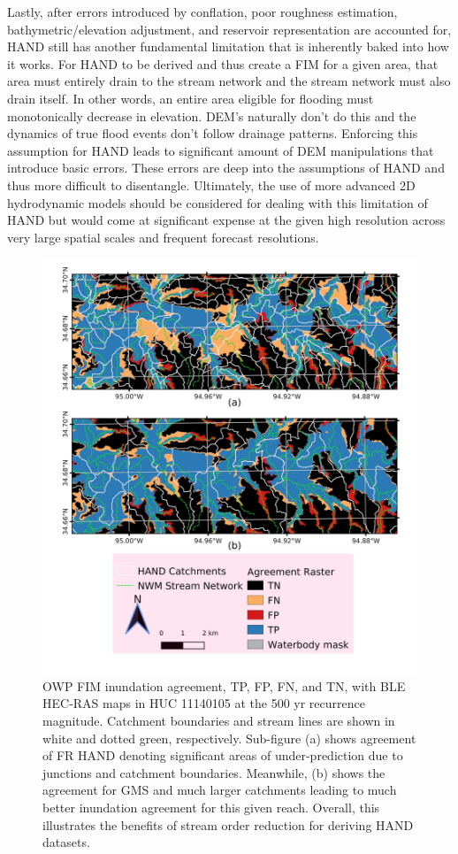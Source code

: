 \documentclass[draft]{dependencies/agujournal2019}
\begin{document}
Lastly, after errors introduced by conflation, poor roughness estimation, bathymetric/elevation adjustment, and reservoir representation are accounted for, HAND still has another fundamental limitation that is inherently baked into how it works.
For HAND to be derived and thus create a FIM for a given area, that area must entirely drain to the stream network and the stream network must also drain itself.
In other words, an entire area eligible for flooding must monotonically decrease in elevation. 
DEM's naturally don't do this and the dynamics of true flood events don't follow drainage patterns.
Enforcing this assumption for HAND leads to significant amount of DEM manipulations that introduce basic errors.
These errors are deep into the assumptions of HAND and thus more difficult to disentangle.
Ultimately, the use of more advanced 2D hydrodynamic models should be considered for dealing with this limitation of HAND but would come at significant expense at the given high resolution across very large spatial scales and frequent forecast resolutions.
%
\begin{figure}[H]
\centering
\includegraphics[scale=1.0]{figures/gms_enhancement.jpg}
\caption{OWP FIM inundation agreement, TP, FP, FN, and TN, with BLE HEC-RAS maps in HUC 11140105 at the 500 yr recurrence magnitude.
Catchment boundaries and stream lines are shown in white and dotted green, respectively.
Sub-figure (a) shows agreement of FR HAND denoting significant areas of under-prediction due to junctions and catchment boundaries.
Meanwhile, (b) shows the agreement for GMS and much larger catchments leading to much better inundation agreement for this given reach. 
Overall, this illustrates the benefits of stream order reduction for deriving HAND datasets.
}
\label{fig:gms_enhancement}
\end{figure}
\end{document}
